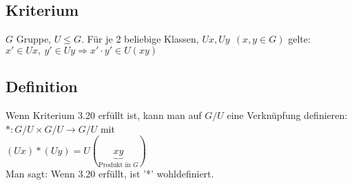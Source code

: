 \documentclass[12pt,titlepage, pdf]{article}
\renewcommand{\>}{\rightarrow}
\renewcommand{\*}{\cdot}
\begin{document}
\subsection{Kriterium}
$G$ Gruppe, $U \leq G$. Für je 2 beliebige Klassen, $Ux, Uy ~~(x,y \in G)$ gelte: \\
$x' \in Ux, ~y' \in Uy \Rightarrow x' \cdot y' \in U(xy)$
\subsection{Definition}
Wenn Kriterium 3.20 erfüllt ist, kann man auf $G/U$ eine Verknüpfung definieren: \\
$*: G/U \times G/U \rightarrow G/U$ mit \\
$(Ux) * (Uy) = U(\underbrace{xy}_{\text{Produkt in $G$}})$\\
Man sagt: Wenn 3.20 erfüllt, ist '*' wohldefiniert.
\end{document}
